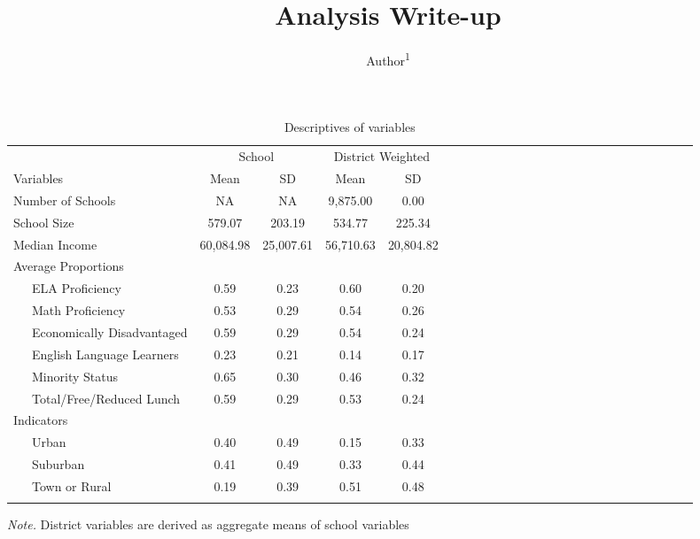 \documentclass[floatsintext,man]{apa6}
\title{Analysis Write-up}
\author{Author\textsuperscript{1}}
\affiliation{
    \vspace{0.5cm}
          \textsuperscript{1} School/Bakery  }
\theoremstyle{definition}
\theoremstyle{definition}
\theoremstyle{definition}
\theoremstyle{remark}
\begin{document}
\maketitle

\setcounter{secnumdepth}{0}



\begin{table}[tbp]
\begin{center}
\begin{threeparttable}
\caption{\label{tab:tbl-desc}Descriptives of variables}
\begin{tabular}{lcccclcccclcccclcccclcccc}
\toprule
 & \multicolumn{2}{c}{School} & \multicolumn{2}{c}{District Weighted} \\
\cmidrule(r){2-3} \cmidrule(r){4-5}
Variables & Mean & SD & Mean & SD\\
\midrule
Number of Schools & NA & NA & 9,875.00 & 0.00\\
School Size & 579.07 & 203.19 & 534.77 & 225.34\\
Median Income & 60,084.98 & 25,007.61 & 56,710.63 & 20,804.82\\
Average Proportions &  &  &  & \\
\ \ \ ELA Proficiency & 0.59 & 0.23 & 0.60 & 0.20\\
\ \ \ Math Proficiency & 0.53 & 0.29 & 0.54 & 0.26\\
\ \ \ Economically Disadvantaged & 0.59 & 0.29 & 0.54 & 0.24\\
\ \ \ English Language Learners & 0.23 & 0.21 & 0.14 & 0.17\\
\ \ \ Minority Status & 0.65 & 0.30 & 0.46 & 0.32\\
\ \ \ Total/Free/Reduced Lunch & 0.59 & 0.29 & 0.53 & 0.24\\
Indicators &  &  &  & \\
\ \ \ Urban & 0.40 & 0.49 & 0.15 & 0.33\\
\ \ \ Suburban & 0.41 & 0.49 & 0.33 & 0.44\\
\ \ \ Town or Rural & 0.19 & 0.39 & 0.51 & 0.48\\
\bottomrule
\addlinespace
\end{tabular}
\begin{tablenotes}[para]
\textit{Note.} District variables are derived as aggregate means of school variables
\end{tablenotes}
\end{threeparttable}
\end{center}
\end{table}
\end{document}

